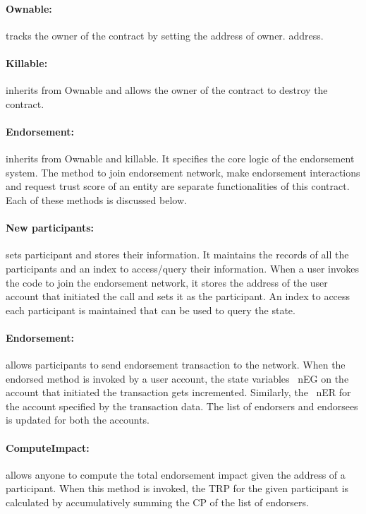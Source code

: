 \paragraph{Ownable:} tracks the owner of the contract by setting the address of
owner.
address.
\paragraph{Killable:}inherits from Ownable and allows the owner of the contract
to destroy the contract.
\paragraph{Endorsement:}inherits from Ownable and killable. It specifies the
core logic of the endorsement system. The method to join endorsement network,
make endorsement interactions and request trust score of an entity are separate
functionalities of this contract. Each of these methods is discussed below. 
\paragraph{New participants:}sets participant and stores their information.
It maintains the records of all the participants and an index to access/query
their information. When a user invokes the code to join the endorsement
network, it stores the address of the user account that initiated the call and
sets it as the participant. An index to access each participant is maintained
that can be used to query the state. 
\paragraph{Endorsement:}allows participants to send endorsement transaction to
the network. When the endorsed method is invoked by a user account, the state
variables ~\ac{nEG} on the account that initiated the transaction gets
incremented. Similarly, the ~\ac{nER} for the account specified by the
transaction data. The list of endorsers and endorsees is updated for both the
accounts. 
\paragraph{ComputeImpact:} allows anyone to compute the total endorsement
impact given the address of a participant. When this method is invoked, the
\ac{TRP} for the given participant is calculated by accumulatively summing the
\ac{CP} of the list of endorsers.  
